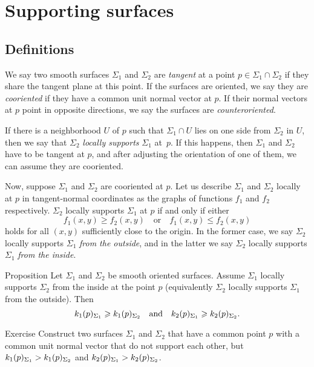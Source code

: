 \chapter{Supporting surfaces}
\label{chap:surface-support}

\section{Definitions}


We say two smooth surfaces $\Sigma_1$ and $\Sigma_2$ are \emph{tangent} at a point $p \in \Sigma_1 \cap \Sigma_2$ if they share the tangent plane at this point.
If the surfaces are oriented, we say they are \emph{cooriented} if they have a common unit normal vector at $p$.
If their normal vectors at $p$ point in opposite directions, we say the surfaces are \index{}\emph{counteroriented}.

If there is a neighborhood $U$ of $p$ such that $\Sigma_1\cap U$ lies on one side from $\Sigma_2$ in $U$, then we say that $\Sigma_2$ \emph{locally supports} $\Sigma_1$ at~$p$.
If this happens, then $\Sigma_1$ and $\Sigma_2$ have to be tangent at $p$, and after adjusting the orientation of one of them, we can assume they are cooriented.

Now, suppose $\Sigma_1$ and $\Sigma_2$ are cooriented at $p$.
Let us describe $\Sigma_1$ and $\Sigma_2$ locally at $p$ in tangent-normal coordinates as the graphs of functions $f_1$ and $f_2$ respectively.
$\Sigma_2$ locally supports $\Sigma_1$ at $p$ if and only if either
\[   f_1(x,y)\ge f_2(x,y)
\quad\text{or}\quad
f_1(x,y)\le f_2(x,y)\]
holds for all $(x,y)$ sufficiently close to the origin.
In the former case, we say  $\Sigma_2$ locally supports $\Sigma_1$ \emph{from the outside}, and in the latter we say $\Sigma_2$ locally supports $\Sigma_1$ \emph{from the inside}.



\begin{thm}{Proposition}\label{prop:surf-support}
Let $\Sigma_1$ and $\Sigma_2$ be smooth oriented surfaces.
Assume $\Sigma_1$ locally supports $\Sigma_2$ from the inside at the point $p$ (equivalently $\Sigma_2$ locally supports $\Sigma_1$ from the outside).
Then 
\[k_1(p)_{\Sigma_1}\ge k_1(p)_{\Sigma_2}\quad\text{and}\quad k_2(p)_{\Sigma_1}\z\ge k_2(p)_{\Sigma_2}.\]
\end{thm}

\begin{thm}{Exercise}\label{ex:surf-support}
Construct two surfaces $\Sigma_1$ and $\Sigma_2$ that have a  common point $p$ with a common unit normal vector that
do not support each other, but
$k_1(p)_{\Sigma_1}\z> k_1(p)_{\Sigma_2}$ and $k_2(p)_{\Sigma_1}\z> k_2(p)_{\Sigma_2}$.
\end{thm}


